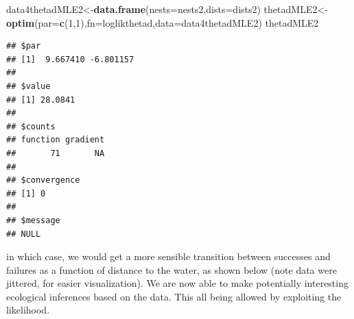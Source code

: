 \documentclass[
]{book}
\newenvironment{Shaded}{\begin{snugshade}}{\end{snugshade}}
\newcommand{\AttributeTok}[1]{\textcolor[rgb]{0.13,0.29,0.53}{#1}}
\newcommand{\DecValTok}[1]{\textcolor[rgb]{0.00,0.00,0.81}{#1}}
\newcommand{\FloatTok}[1]{\textcolor[rgb]{0.00,0.00,0.81}{#1}}
\newcommand{\FunctionTok}[1]{\textcolor[rgb]{0.13,0.29,0.53}{\textbf{#1}}}
\newcommand{\NormalTok}[1]{#1}
\newcommand{\OtherTok}[1]{\textcolor[rgb]{0.56,0.35,0.01}{#1}}
\newcommand{\SpecialCharTok}[1]{\textcolor[rgb]{0.81,0.36,0.00}{\textbf{#1}}}
\newcommand{\StringTok}[1]{\textcolor[rgb]{0.31,0.60,0.02}{#1}}
\begin{document}
\begin{Shaded}
\begin{Highlighting}[]
\NormalTok{data4thetadMLE2}\OtherTok{\textless{}{-}}\FunctionTok{data.frame}\NormalTok{(}\AttributeTok{nests=}\NormalTok{nests2,}\AttributeTok{dists=}\NormalTok{dists2)}
\NormalTok{thetadMLE2}\OtherTok{\textless{}{-}}\FunctionTok{optim}\NormalTok{(}\AttributeTok{par=}\FunctionTok{c}\NormalTok{(}\DecValTok{1}\NormalTok{,}\DecValTok{1}\NormalTok{),}\AttributeTok{fn=}\NormalTok{loglikthetad,}\AttributeTok{data=}\NormalTok{data4thetadMLE2)}
\NormalTok{thetadMLE2}
\end{Highlighting}
\end{Shaded}

\begin{verbatim}
## $par
## [1]  9.667410 -6.801157
## 
## $value
## [1] 28.0841
## 
## $counts
## function gradient 
##       71       NA 
## 
## $convergence
## [1] 0
## 
## $message
## NULL
\end{verbatim}

in which case, we would get a more sensible transition between successes and failures as a function of distance to the water, as shown below (note data were jittered, for easier visualization). We are now able to make potentially interesting ecological inferences based on the data. This all being allowed by exploiting the likelihood.

\begin{Shaded}
\end{Shaded}
\end{document}
